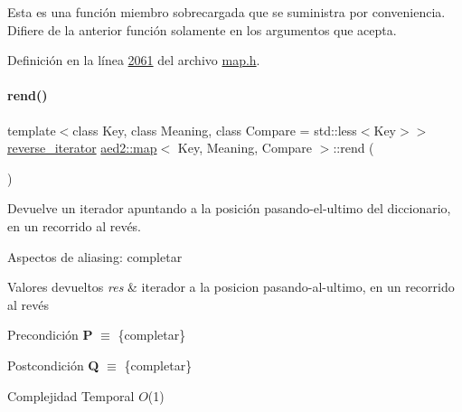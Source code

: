 Esta es una función miembro sobrecargada que se suministra por conveniencia. Difiere de la anterior función solamente en los argumentos que acepta. 

Definición en la línea \hyperlink{map_8h_source_l02061}{2061} del archivo \hyperlink{map_8h_source}{map.\+h}.

\mbox{\label{classaed2_1_1map_a277f03b4f4b6b98879e4e4921081801f_a277f03b4f4b6b98879e4e4921081801f}} 
\paragraph{\texorpdfstring{rend()}{rend()}\hspace{0.1cm}{\footnotesize\ttfamily [1/2]}}
{\footnotesize\ttfamily template$<$class Key, class Meaning, class Compare = std\+::less$<$\+Key$>$$>$ \\
\hyperlink{classaed2_1_1map_a8e6a592062260177fd73b2f9897b1dd5_a8e6a592062260177fd73b2f9897b1dd5}{reverse\+\_\+iterator} \hyperlink{classaed2_1_1map}{aed2\+::map}$<$ Key, Meaning, Compare $>$\+::rend (\begin{DoxyParamCaption}{ }\end{DoxyParamCaption})\hspace{0.3cm}{\ttfamily [inline]}}



Devuelve un iterador apuntando a la posición pasando-\/el-\/ultimo del diccionario, en un recorrido al revés. 

\begin{DoxyParagraph}{Aspectos de aliasing\+:}
completar
\end{DoxyParagraph}

\begin{DoxyRetVals}{Valores devueltos}
{\em res} & iterador a la posicion pasando-\/al-\/ultimo, en un recorrido al revés\\
\hline
\end{DoxyRetVals}
\begin{DoxyPrecond}{Precondición}
{\bfseries P} $\equiv$ \{completar\} 
\end{DoxyPrecond}
\begin{DoxyPostcond}{Postcondición}
{\bfseries Q} $\equiv$ \{completar\}
\end{DoxyPostcond}

\begin{DoxyDescription}
\item[Complejidad Temporal]$O$(1)
\end{DoxyDescription}

